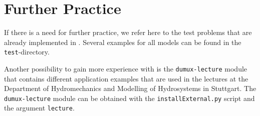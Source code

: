 \section{Further Practice}
\label{tutorial-furtherpractice}

If there is a need for further practice, we refer here to the test problems that
are already implemented in \Dumux. Several examples for all models
can be found in the \texttt{test}-directory. %

Another possibility to gain more experience with \Dumux is the \texttt{dumux-lecture} module
that contains different application examples that are used in the lectures at the
Department of Hydromechanics and Modelling of Hydrosystems in Stuttgart.
The \texttt{dumux-lecture} module can be obtained with the \texttt{installExternal.py} 
script and the argument \texttt{lecture}. 

